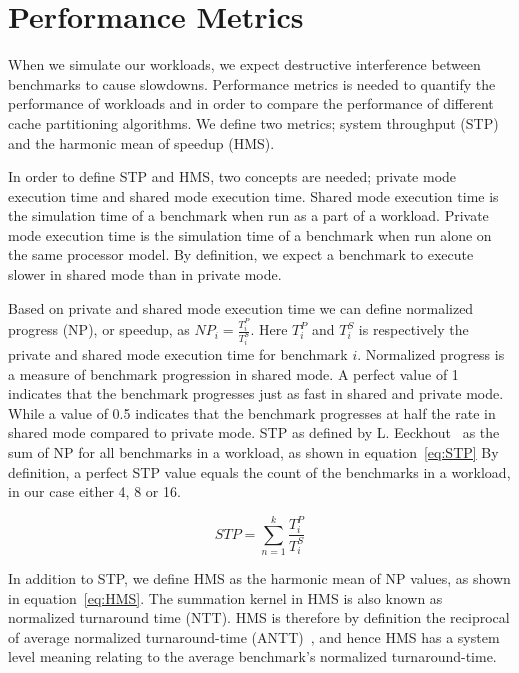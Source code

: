 \section{Performance Metrics}
\label{sec:methodology:metrics}

When we simulate our workloads, we expect destructive interference between benchmarks to cause slowdowns.
Performance metrics is needed to quantify the performance of workloads and in order to compare the performance of different cache partitioning algorithms.
We define two metrics; system throughput (STP) and the harmonic mean of speedup (HMS).

In order to define STP and HMS, two concepts are needed; private mode execution time and shared mode execution time.
Shared mode execution time is the simulation time of a benchmark when run as a part of a workload.
Private mode execution time is the simulation time of a benchmark when run alone on the same processor model.
By definition, we expect a benchmark to execute slower in shared mode than in private mode.

Based on private and shared mode execution time we can define normalized progress (NP), or speedup, as $NP_i = \frac{T^{P}_i}{T^{S}_i}$.
Here $T^{P}_i$ and $T^{S}_i$ is respectively the private and shared mode execution time for benchmark $i$.
Normalized progress is a measure of benchmark progression in shared mode.
A perfect value of 1 indicates that the benchmark progresses just as fast in shared and private mode.
While a value of 0.5 indicates that the benchmark progresses at half the rate in shared mode compared to private mode.
STP as defined by L. Eeckhout~\cite{Eeckhout2010} as the sum of NP for all benchmarks in a workload, as shown in equation~\ref{eq:STP}
By definition, a perfect STP value equals the count of the benchmarks in a workload, in our case either 4, 8 or 16.

\begin{equation} \label{eq:STP} 
 STP = {\sum\limits_{n=1}^{k}}\frac{T^{P}_i}{T^{S}_i}
\end{equation}

In addition to STP, we define HMS as the harmonic mean of NP values, as shown in equation~\ref{eq:HMS}.
The summation kernel in HMS is also known as normalized turnaround time (NTT).
HMS is therefore by definition the reciprocal of average normalized turnaround-time (ANTT)~\cite{Eeckhout2010}, and hence HMS has a system level meaning relating to the average benchmark's normalized turnaround-time.

